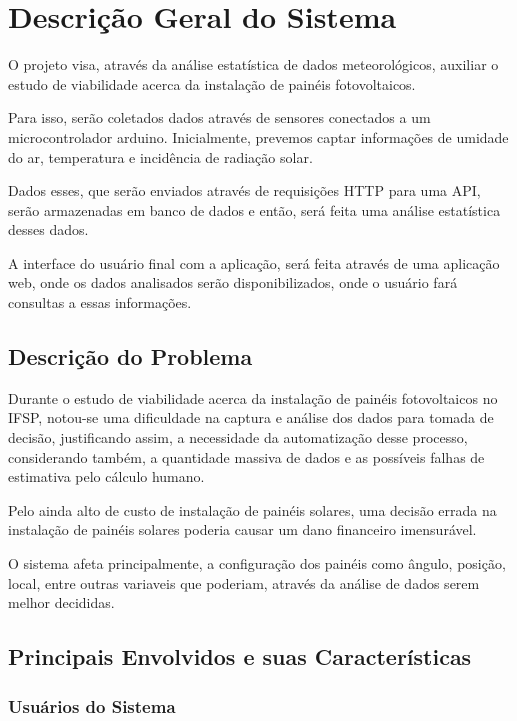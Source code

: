 \chapter{Descrição Geral do Sistema}

O projeto visa, através da análise estatística de dados meteorológicos, auxiliar o estudo de viabilidade acerca da instalação de painéis fotovoltaicos.

Para isso, serão coletados dados através de sensores conectados a um microcontrolador arduino. Inicialmente, prevemos captar informações de umidade do ar, temperatura e incidência de radiação solar.

Dados esses, que serão enviados através de requisições HTTP para uma API, serão armazenadas em banco de dados e então, será feita uma análise estatística desses dados.

A interface do usuário final com a aplicação, será feita através de uma aplicação web, onde os dados analisados serão disponibilizados, onde o usuário fará consultas a essas informações.

\section{Descrição do Problema}

Durante o estudo de viabilidade acerca da instalação de painéis fotovoltaicos no IFSP, notou-se uma dificuldade na captura e análise dos dados para tomada de decisão, justificando assim, a necessidade da automatização desse processo, considerando também, a quantidade massiva de dados e as possíveis falhas de estimativa pelo cálculo humano.

Pelo ainda alto de custo de instalação de painéis solares, uma decisão errada na instalação de painéis solares poderia causar um dano financeiro imensurável.

O sistema afeta principalmente, a configuração dos painéis como ângulo, posição, local, entre outras variaveis que poderiam, através da análise de dados serem melhor decididas.

\section{Principais Envolvidos e suas Características}

\subsection{Usuários do Sistema}

